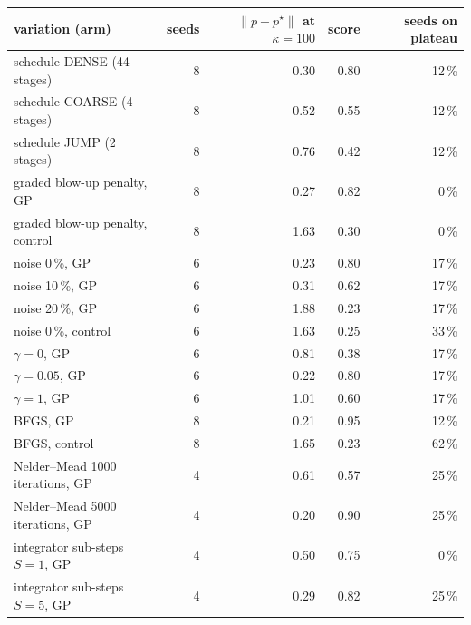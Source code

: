 \begin{tabular}{lrrrr}
\toprule
variation (arm) & seeds & $\|p-p^\star\|$ at $\kappa=100$ & score & seeds on plateau\\
\midrule
schedule DENSE (44 stages) & 8 & 0.30 & 0.80 & 12\,\% \\
schedule COARSE (4 stages) & 8 & 0.52 & 0.55 & 12\,\% \\
schedule JUMP (2 stages) & 8 & 0.76 & 0.42 & 12\,\% \\
graded blow-up penalty, GP & 8 & 0.27 & 0.82 & 0\,\% \\
graded blow-up penalty, control & 8 & 1.63 & 0.30 & 0\,\% \\
noise 0\,\%, GP & 6 & 0.23 & 0.80 & 17\,\% \\
noise 10\,\%, GP & 6 & 0.31 & 0.62 & 17\,\% \\
noise 20\,\%, GP & 6 & 1.88 & 0.23 & 17\,\% \\
noise 0\,\%, control & 6 & 1.63 & 0.25 & 33\,\% \\
$\gamma=0$, GP & 6 & 0.81 & 0.38 & 17\,\% \\
$\gamma=0.05$, GP & 6 & 0.22 & 0.80 & 17\,\% \\
$\gamma=1$, GP & 6 & 1.01 & 0.60 & 17\,\% \\
BFGS, GP & 8 & 0.21 & 0.95 & 12\,\% \\
BFGS, control & 8 & 1.65 & 0.23 & 62\,\% \\
Nelder--Mead 1000 iterations, GP & 4 & 0.61 & 0.57 & 25\,\% \\
Nelder--Mead 5000 iterations, GP & 4 & 0.20 & 0.90 & 25\,\% \\
integrator sub-steps $S=1$, GP & 4 & 0.50 & 0.75 & 0\,\% \\
integrator sub-steps $S=5$, GP & 4 & 0.29 & 0.82 & 25\,\% \\
\bottomrule
\end{tabular}
